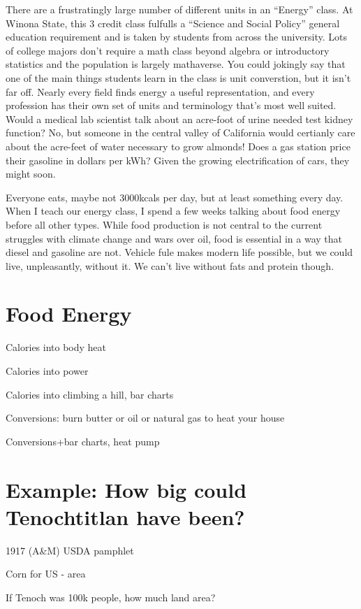 \documentclass[12pt]{iopart}
\begin{document}
There are a frustratingly large number of different units in an ``Energy'' class.  At Winona State, this 3 credit class fulfulls a ``Science and Social Policy'' general education requirement and is taken by students from across the university.   Lots of college majors don't require a math class beyond algebra or introductory statistics and the population is largely mathaverse. You could jokingly say that one of the main things students learn in the class is unit converstion, but it isn't far off.  Nearly every field finds energy a useful representation, and every profession has their own set of units and terminology that's most well suited.  Would a medical lab scientist talk about an acre-foot of urine needed test kidney function?  No, but someone in the central valley of California would certianly care about the acre-feet of water necessary to grow almonds!  Does a gas station price their gasoline in dollars per kWh? Given the growing electrification of cars, they might soon.

Everyone eats, maybe not 3000kcals per day, but at least something every day.  When I teach our energy class, I spend a few weeks talking about food energy before all other types.  While food production is not central to the current struggles with climate change and wars over oil, food is essential in a way that diesel and gasoline are not.  Vehicle fule makes modern life possible, but we could live, unpleasantly, without it.  We can't live without fats and protein though.  

\section{Food Energy}

Calories into body heat

Calories into power

Calories into climbing a hill, bar charts

Conversions: burn butter or oil or natural gas to heat your house

Conversions+bar charts, heat pump

\section{Example: How big could Tenochtitlan have been?}

1917 (A&M) USDA pamphlet

Corn for US - area

If Tenoch was 100k people, how much land area?
\end{document}
